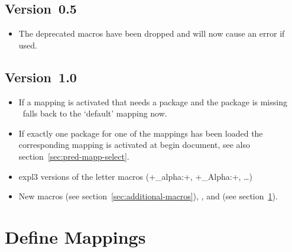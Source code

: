 \documentclass[load-preamble+]{cnltx-doc}
\begin{document}
\subsection{Version~0.5}
\begin{itemize}
  \item The deprecated macros  have been dropped and
    will now cause an error if used.
\end{itemize}

\subsection{Version~1.0}
\begin{itemize}
  \item If a mapping is activated that needs a package and the package is
    missing \chemgreek\ falls back to the `default' mapping now.
  \item If exactly one package for one of the mappings has been loaded the
    corresponding mapping is activated at begin document, see also
    section~\ref{sec:pred-mapp-select}.
  \item expl3 versions of the letter macros (\verbcode+\chemgreek_alpha:+,
    \verbcode+\chemgreek_Alpha:+, \ldots)
  \item New macros  (see
    section~\ref{sec:additional-macros}), ,
     and  (see
    section~\ref{sec:define-mappings}).
\end{itemize}

\section{Define Mappings}\label{sec:define-mappings}
\end{document}
